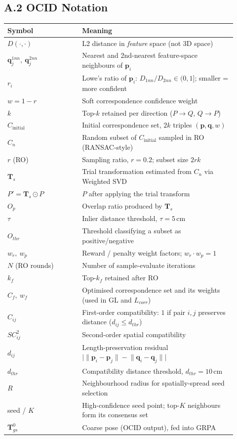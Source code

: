 \documentclass[11pt,a4paper]{article}
\begin{document}
\subsection*{A.2 OCID Notation}
\begin{center}
\begin{tabular}{@{}p{0.3\linewidth}p{0.62\linewidth}@{}}
\toprule
Symbol & Meaning \\
\midrule
$D(\cdot,\cdot)$ & L2 distance in \emph{feature} space (not 3D space) \\
$\mathbf{q}_j^{1nn},\ \mathbf{q}_j^{2nn}$ & Nearest and 2nd-nearest feature-space neighbours of $\mathbf{p}_i$ \\
$r_i$ & Lowe's ratio of $\mathbf{p}_i$: $D_{1nn}/D_{2nn}\in(0,1]$; smaller = more confident \\
$w=1-r$ & Soft correspondence confidence weight \\
$k$ & Top-$k$ retained per direction ($P\!\to\!Q$, $Q\!\to\!P$) \\
$C_{\text{initial}}$ & Initial correspondence set, $2k$ triples $(\mathbf{p},\mathbf{q},w)$ \\
\midrule
$C_n$ & Random subset of $C_{\text{initial}}$ sampled in RO (RANSAC-style) \\
$r$ (RO) & Sampling ratio, $r=0.2$; subset size $2rk$ \\
$\mathbf{T}_s$ & Trial transformation estimated from $C_n$ via Weighted SVD \\
$P'=\mathbf{T}_s\odot P$ & $P$ after applying the trial transform \\
$O_p$ & Overlap ratio produced by $\mathbf{T}_s$ \\
$\tau$ & Inlier distance threshold, $\tau=5\,$cm \\
$O_{thr}$ & Threshold classifying a subset as positive/negative \\
$w_r,\ w_p$ & Reward / penalty weight factors; $w_r\cdot w_p=1$ \\
$N$ (RO rounds) & Number of sample-evaluate iterations \\
$k_f$ & Top-$k_f$ retained after RO \\
$C_f,\ w_f$ & Optimised correspondence set and its weights (used in GL and $L_{corr}$) \\
\midrule
$C_{ij}$ & First-order compatibility: $1$ if pair $i,j$ preserves distance ($d_{ij}\le d_{thr}$) \\
$SC^2_{ij}$ & Second-order spatial compatibility \\
$d_{ij}$ & Length-preservation residual $\bigl|\lVert\mathbf{p}_i-\mathbf{p}_j\rVert-\lVert\mathbf{q}_i-\mathbf{q}_j\rVert\bigr|$ \\
$d_{thr}$ & Compatibility distance threshold, $d_{thr}=10\,$cm \\
$R$ & Neighbourhood radius for spatially-spread seed selection \\
seed / $K$ & High-confidence seed point; top-$K$ neighbours form its consensus set \\
$\mathbf{T}_{gs}^0$ & Coarse pose (OCID output), fed into GRPA \\
\bottomrule
\end{tabular}
\end{center}
\end{document}
